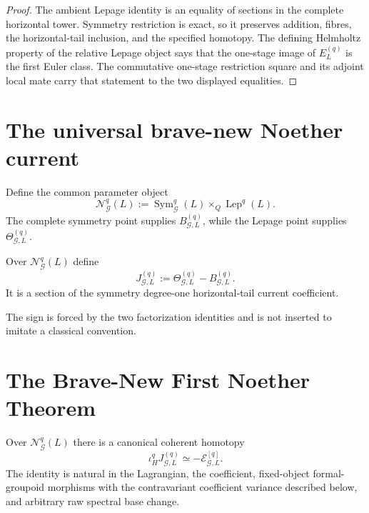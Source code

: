 \begin{proof}
The ambient Lepage identity is an equality of sections in the complete horizontal
tower.  Symmetry restriction is exact, so it preserves addition, fibres, the
horizontal-tail inclusion, and the specified homotopy.  The defining Helmholtz
property of the relative Lepage object says that the one-stage image of
$E_L^{(q)}$ is the first Euler class.  The commutative one-stage restriction
square and its adjoint local mate carry that statement to the two displayed
equalities.
\end{proof}

\section{The universal brave-new Noether current}
\label{sec:symmetry-noether-the-universal-brave-new-noether-current}

Define the common parameter object
\[
\mathcal N_{\mathcal G}^{q}(L)
:=
\operatorname{Sym}_{\mathcal G}^{q}(L)
\times_Q
\operatorname{Lep}^q(L).
\]
The complete symmetry point supplies
$B_{\mathcal G,L}^{(q)}$, while the Lepage point supplies
$\Theta_{\mathcal G,L}^{(q)}$.

\begin{definition}
\label{def:symmetry-noether-universal-brave-new-noether-current}
Over $\mathcal N_{\mathcal G}^{q}(L)$ define
\[
\boxed{
J_{\mathcal G,L}^{(q)}
:=
\Theta_{\mathcal G,L}^{(q)}
-
B_{\mathcal G,L}^{(q)}.
}
\]
It is a section of the symmetry degree-one horizontal-tail current coefficient.
\end{definition}

The sign is forced by the two factorization identities and is not inserted to
imitate a classical convention.

\section{The Brave-New First Noether Theorem}
\label{sec:symmetry-noether-the-brave-new-first-noether-theorem}

\begin{theorem}
\label{thm:symmetry-noether-intrinsic-off-shell-first-noether-homotopy}
Over $\mathcal N_{\mathcal G}^{q}(L)$ there is a canonical coherent homotopy
\[
\boxed{
\iota_H^q J_{\mathcal G,L}^{(q)}
\simeq
-\mathscr E_{\mathcal G,L}^{[q]}.
}
\]
The identity is natural in the Lagrangian, the coefficient, fixed-object
formal-groupoid morphisms with the contravariant coefficient variance described
below, and arbitrary raw spectral base change.
\end{theorem}

